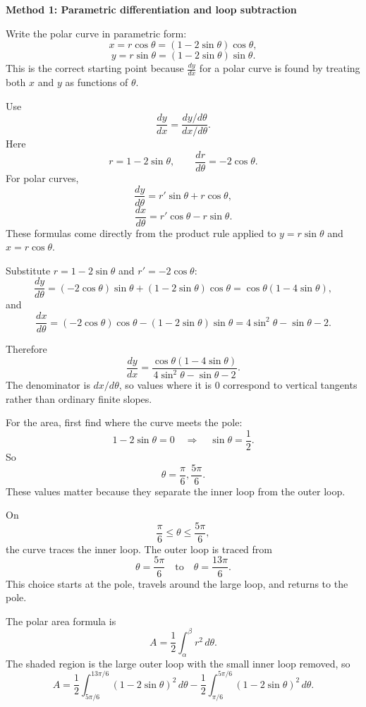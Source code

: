 \documentclass[a4paper,12pt,twocolumn]{article}
\newenvironment{solutionbox}{\begin{framed}}{\end{framed}}
\begin{document}
\begin{solutionbox}
\textbf{Method 1: Parametric differentiation and loop subtraction}

\begin{steps}
\item Write the polar curve in parametric form:
\[
x=r\cos\theta=(1-2\sin\theta)\cos\theta,
\]
\[
y=r\sin\theta=(1-2\sin\theta)\sin\theta.
\]
This is the correct starting point because \(\frac{dy}{dx}\) for a polar curve is found by treating both \(x\) and \(y\) as functions of \(\theta\).

\item Use
\[
\frac{dy}{dx}=\frac{dy/d\theta}{dx/d\theta}.
\]
Here
\[
r=1-2\sin\theta,
\qquad
\frac{dr}{d\theta}=-2\cos\theta.
\]
For polar curves,
\[
\frac{dy}{d\theta}=r'\sin\theta+r\cos\theta,
\]
\[
\frac{dx}{d\theta}=r'\cos\theta-r\sin\theta.
\]
These formulas come directly from the product rule applied to \(y=r\sin\theta\) and \(x=r\cos\theta\).

\item Substitute \(r=1-2\sin\theta\) and \(r'=-2\cos\theta\):
\[
\frac{dy}{d\theta}
=(-2\cos\theta)\sin\theta+(1-2\sin\theta)\cos\theta
=\cos\theta(1-4\sin\theta),
\]
and
\[
\frac{dx}{d\theta}
=(-2\cos\theta)\cos\theta-(1-2\sin\theta)\sin\theta
=4\sin^2\theta-\sin\theta-2.
\]

\item Therefore
\[
\frac{dy}{dx}
=\boxed{\frac{\cos\theta(1-4\sin\theta)}
{4\sin^2\theta-\sin\theta-2}}.
\]
The denominator is \(dx/d\theta\), so values where it is \(0\) correspond to vertical tangents rather than ordinary finite slopes.

\item For the area, first find where the curve meets the pole:
\[
1-2\sin\theta=0
\quad\Longrightarrow\quad
\sin\theta=\frac12.
\]
So
\[
\theta=\frac{\pi}{6},\frac{5\pi}{6}.
\]
These values matter because they separate the inner loop from the outer loop.

\item On
\[
\frac{\pi}{6}\le\theta\le\frac{5\pi}{6},
\]
the curve traces the inner loop. The outer loop is traced from
\[
\theta=\frac{5\pi}{6}
\quad\text{to}\quad
\theta=\frac{13\pi}{6}.
\]
This choice starts at the pole, travels around the large loop, and returns to the pole.

\item The polar area formula is
\[
A=\frac12\int_{\alpha}^{\beta}r^2\,d\theta.
\]
The shaded region is the large outer loop with the small inner loop removed, so
\[
A
=\frac12\int_{5\pi/6}^{13\pi/6}(1-2\sin\theta)^2\,d\theta
-\frac12\int_{\pi/6}^{5\pi/6}(1-2\sin\theta)^2\,d\theta.
\]


\end{steps}
\end{solutionbox}
\end{document}
